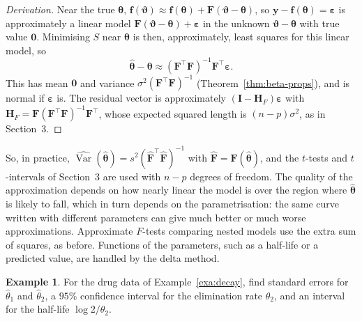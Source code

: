 \documentclass[11pt,a4paper]{article}
\numberwithin{equation}{section}
\theoremstyle{definition}
\newtheorem{exa}[thm]{Example}
\begin{document}
\begin{proof}[Derivation]
Near the true $\boldsymbol\theta$, $\mathbf{f}(\boldsymbol\vartheta) \approx \mathbf{f}(\boldsymbol\theta) + \mathbf{F}(\boldsymbol\vartheta - \boldsymbol\theta)$, so
$\mathbf{y} - \mathbf{f}(\boldsymbol\theta) = \boldsymbol\varepsilon$ is approximately a linear model $\mathbf{F}(\boldsymbol\vartheta - \boldsymbol\theta) + \boldsymbol\varepsilon$ in the unknown $\boldsymbol\vartheta - \boldsymbol\theta$ with true value $\mathbf{0}$.
Minimising $S$ near $\boldsymbol\theta$ is then, approximately, least squares for this linear model, so
\[
\hat{\boldsymbol\theta} - \boldsymbol\theta \approx (\mathbf{F}^\top\mathbf{F})^{-1}\mathbf{F}^\top\boldsymbol\varepsilon .
\]
This has mean $\mathbf{0}$ and variance $\sigma^2(\mathbf{F}^\top\mathbf{F})^{-1}$ (Theorem~\ref{thm:beta-props}), and is normal if $\boldsymbol\varepsilon$ is. The residual vector is
approximately $(\mathbf{I} - \mathbf{H}_F)\boldsymbol\varepsilon$ with $\mathbf{H}_F = \mathbf{F}(\mathbf{F}^\top\mathbf{F})^{-1}\mathbf{F}^\top$, whose expected squared length is $(n - p)\sigma^2$, as in
Section~3.
\end{proof}

So, in practice, $\widehat{\operatorname{Var}}(\hat{\boldsymbol\theta}) = s^2(\hat{\mathbf{F}}^\top\hat{\mathbf{F}})^{-1}$ with $\hat{\mathbf{F}} = \mathbf{F}(\hat{\boldsymbol\theta})$, and the $t$-tests and $t$-intervals
of Section~3 are used with $n - p$ degrees of freedom. The quality of the approximation depends on how
nearly linear the model is over the region where $\hat{\boldsymbol\theta}$ is likely to fall, which in turn depends on the
parametrisation: the same curve written with different parameters can give much better or much worse
approximations. Approximate $F$-tests comparing nested models use the extra sum of squares, as before.
Functions of the parameters, such as a half-life or a predicted value, are handled by the delta method.

\begin{exa}\label{exa:decay-inference}
For the drug data of Example~\ref{exa:decay}, find standard errors for $\hat\theta_1$ and $\hat\theta_2$, a $95\%$ confidence interval for the
elimination rate $\theta_2$, and an interval for the half-life $\log 2/\theta_2$.
\end{exa}
\end{document}
